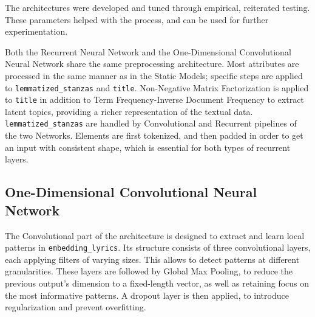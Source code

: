 



The architectures were developed and tuned through empirical,
reiterated testing. These parameters helped with the process, and can
be used for further experimentation.


Both the Recurrent Neural Network and the One-Dimensional Convolutional
Neural Network share the same preprocessing
architecture. Most attributes are processed in the same manner as in
the Static Models; specific steps are applied to \texttt{lemmatized\_stanzas}
and \texttt{title}.
Non-Negative Matrix Factorization is applied to \texttt{title} in addition to
Term Frequency-Inverse Document Frequency
to extract latent topics, providing a richer representation of the
textual data.\\

\texttt{lemmatized\_stanzas} are handled by Convolutional and Recurrent
pipelines of the two Networks.
Elements are first tokenized, and then padded in order to
get an input with consistent shape, which is essential for both types of
recurrent layers.\\

\subsection*{One-Dimensional Convolutional Neural Network}

The Convolutional part of the architecture is designed to extract and learn
local patterns in \texttt{embedding\_lyrics}.
Its structure consists of three convolutional layers, each applying filters of
varying sizes. This allows to detect patterns at different granularities.
These layers are followed by Global Max Pooling, to reduce the previous output's
dimension to a fixed-length vector, as well as retaining focus on the most
informative patterns.
A dropout layer is then applied, to introduce regularization and prevent
overfitting.



